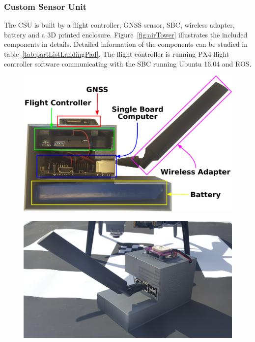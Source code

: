 \subsubsection{Custom Sensor Unit} %
\label{ssub:custom_sensor_unit}
The \gls{CSU} is built by a flight controller, \gls{GNSS} sensor, \gls{SBC}, wireless adapter, battery and a 3D printed enclosure. Figure~\ref{fig:airTower} illustrates the included components in details. Detailed information of the components can be studied in table~\ref{tab:partListLandingPad}. The flight controller is running PX4 flight controller software communicating with the \gls{SBC} running Ubuntu 16.04 and \gls{ROS}. 
\begin{figure}[ht]
\centering
  \begin{minipage}{.49\textwidth}
    \centering
    \includegraphics[width=\linewidth]{img/AirTower.png}
    \label{fig:airTower}
  \end{minipage}%
  \hfill
  \begin{minipage}{.49\textwidth}
    \centering
    \includegraphics[width=\linewidth]{img/airTraficControl.jpg}
    \label{fig:airTowerBack}
  \end{minipage}
\end{figure}
